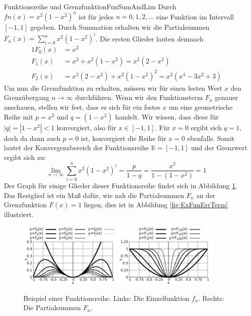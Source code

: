 \begin{example}{Funktionsreihe und Grenzfunktion}{FunSumAndLim}
    Durch $fn(x) = x^2 (1-x^2)^n$ ist für jedes $n=0,1,2,\dots$ eine Funktion im Intervall $[-1,1]$ gegeben. Durch Summation erhalten wir die Partialsummen $F_n(x) = \sum\limits_{i=0}^n x^2 (1-x^2)^i$. Die ersten Glieder lauten demnach
    \begin{alignat*}{1}
        F_0(x) &= x^2 \\
        F_1(x) &= x^2 + x^2 (1-x^2) = x^2 (2-x^2) \\
        F_2(x) &= x^2 (2-x^2) + x^2 (1-x^2)^2 = x^2 (x^4-3x^2+3)
    \end{alignat*}
    Um nun die Grenzfunktion zu erhalten, müssen wir für einen festen Wert $x$ den Grenzübergang $n \to \infty$ durchführen. Wenn wir den Funktionsterm $F_n$ genauer anschauen, stellen wir fest, dass es sich für ein festes $x$ um eine geometrische Reihe mit $p=x^2$ und $q=(1-x^2)$ handelt. Wir wissen, dass diese für $|q|=|1-x^2|<1$ konvergiert, also für $x \in [-1,1]$. Für $x=0$ ergibt sich $q=1$, doch da dann auch $p=0$ ist, konvergiert die Reihe für $x=0$ ebenfalls. Somit lautet der Konvergenzbereich der Funktionsreihe $\mathbb{K} = [-1,1]$ und der Grenzwert ergibt sich zu:
    $$
        \lim\limits_{n\to\infty} \sum\limits_{i=0}^n x^2 (1-x^2)^i = \frac{p}{1-q} = \frac{x^2}{1-(1-x^2)} = 1
    $$
    Der Graph für einige Glieder dieser Funktionsreihe findet sich in Abbildung \ref{fig:ExFunSum}. Das Restglied ist ein Maß dafür, wie nah die Partialsummen $F_n$ an der Grenzfunktion $F(x) = 1$ liegen, dies ist in Abbildung \ref{fig:ExFunErrTerm} illustriert.
\end{example}

\begin{figure}
    \centering
    \includegraphics[width=0.45\textwidth]{./gnuplot/example-function-sum}
    \includegraphics[width=0.45\textwidth]{./gnuplot/example-function-sum-summed}
    \caption[Einzelfunktionen und Partialsummen einer Funktionsreihe]{Beispiel einer Funktionsreihe. Links: Die Einzelfunktion $f_n$. Rechts: Die Partialsummen $F_n$.}
    \label{fig:ExFunSum}
\end{figure}

